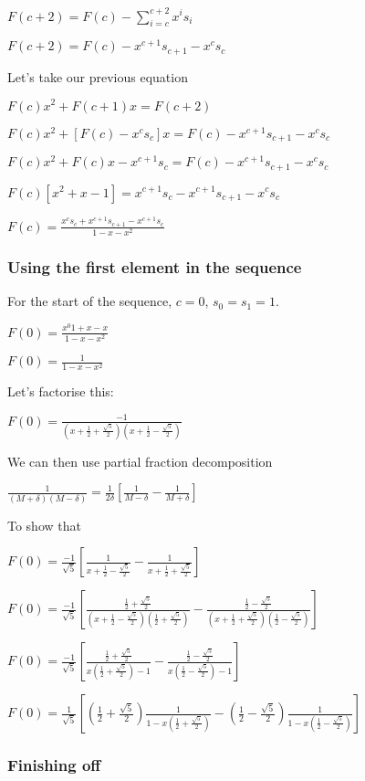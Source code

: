 $F(c+2)=F(c)-\sum^{c+2}_{i=c} x^i s_i$

$F(c+2)=F(c)-x^{c+1}s_{c+1}-x^c s_c$

Let's take our previous equation

$F(c)x^2+F(c+1)x=F(c+2)$

$F(c)x^2+[F(c)-x^c s_c]x=F(c)-x^{c+1}s_{c+1}-x^c s_c$

$F(c)x^2+F(c)x-x^{c+1} s_c=F(c)-x^{c+1}s_{c+1}-x^c s_c$

$F(c)[x^2+x-1]=x^{c+1}s_c-x^{c+1}s_{c+1}-x^c s_c$

$F(c)=\frac{x^c s_c + x^{c+1}s_{c+1}-x^{c+1}s_c}{1-x-x^2}$

\subsubsection{Using the first element in the sequence}

For the start of the sequence, \(c=0\), \(s_0=s_1=1\).

$F(0)=\frac{x^0 1 + x - x}{1-x-x^2}$

$F(0)=\frac{1}{1-x-x^2}$

Let's factorise this:

$F(0)=\frac{-1}{(x+\frac{1}{2}+\frac{\sqrt 5}{2})(x+\frac{1}{2}-\frac{\sqrt 5}{2})}$

We can then use partial fraction decomposition

$\frac{1}{(M+\delta)(M-\delta)}=\frac{1}{2\delta}[\frac{1}{M-\delta}-\frac{1}{M+\delta}]$

To show that

$F(0)=\frac{-1}{\sqrt 5}[\frac{1}{x+\frac{1}{2}-\frac{\sqrt 5}{2}}-\frac{1}{x+\frac{1}{2}+\frac{\sqrt 5}{2}}]$

$F(0)=\frac{-1}{\sqrt 5}[\frac{\frac{1}{2}+\frac{\sqrt 5}{2}}{(x+\frac{1}{2}-\frac{\sqrt 5}{2})(\frac{1}{2}+\frac{\sqrt 5}{2})}-\frac{\frac{1}{2}-\frac{\sqrt 5}{2}}{(x+\frac{1}{2}+\frac{\sqrt 5}{2})(\frac{1}{2}-\frac{\sqrt 5}{2})}]$

$F(0)=\frac{-1}{\sqrt 5}[\frac{\frac{1}{2}+\frac{\sqrt 5}{2}}{x(\frac{1}{2}+\frac{\sqrt 5}{2})-1}-\frac{\frac{1}{2}-\frac{\sqrt 5}{2}}{x(\frac{1}{2}-\frac{\sqrt 5}{2})-1}]$

$F(0)=\frac{1}{\sqrt 5}[(\frac{1}{2}+\frac{\sqrt 5}{2})\frac{1}{1-x(\frac{1}{2}+\frac{\sqrt 5}{2})}-(\frac{1}{2}-\frac{\sqrt 5}{2})\frac{1}{1-x(\frac{1}{2}-\frac{\sqrt 5}{2})}]$

\subsubsection{Finishing off}

